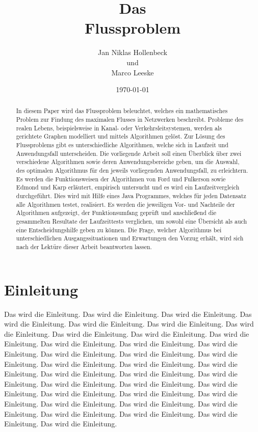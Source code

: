 \documentclass[11pt]{llncs}
\title{Das \\ Flussproblem}
\author{Jan Niklas Hollenbeck \\ und \\ Marco Leeske}
\date{\today}
\begin{document}
\maketitle

\newpage

\begin{abstract}

In diesem Paper wird das Flussproblem beleuchtet, welches ein mathematisches Problem zur Findung des maximalen Flusses in Netz\-werken beschreibt.
 Probleme des realen Lebens, beispielsweise in Kanal- oder Verkehrsleitsystemen, werden als gerichtete Graphen mo\-delliert und mittels Algorithmen gelöst.
 Zur Lösung des Flussproblems gibt es unterschiedliche Algorithmen, welche sich in Laufzeit und Anwendungsfall unterscheiden.
 Die vorliegende Arbeit soll einen Überblick über zwei verschiedene Algorithmen sowie deren Anwendungsbereiche geben, um die Auswahl, des optimalen Algorithmus für den jeweils vorliegenden Anwendungsfall, zu erleichtern.
 Es werden die Funktionsweisen der Algorithmen von Ford und Fulkerson sowie Edmond und Karp erläutert, empirisch untersucht und es wird ein Laufzeitvergleich durchgeführt.
 Dies wird mit Hilfe eines Java Programmes, welches für jeden Datensatz alle Algorithmen testet, realisiert.
Es werden die jeweiligen Vor- und Nachteile der Algorithmen aufgezeigt, der Funktionsumfang geprüft und anschließend die gesammelten Resultate der Laufzeittests verglichen, um sowohl eine Übersicht als auch eine Entscheidungshilfe geben zu können.
 Die Frage, welcher Algorithmus bei unterschiedlichen Ausgangssituationen und Erwartungen den Vorzug erhält, wird sich nach der Lektüre dieser Arbeit beantworten lassen. 

\end{abstract}


\section{Einleitung}
\label{Einleitung}

Das wird die Einleitung. Das wird die Einleitung. Das wird die Einleitung. Das wird die Einleitung. Das wird die Einleitung. Das wird die Einleitung. Das wird die Einleitung. Das wird die Einleitung. Das wird die Einleitung. Das wird die Einleitung. Das wird die Einleitung. Das wird die Einleitung. Das wird die Einleitung. Das wird die Einleitung. Das wird die Einleitung. Das wird die Einleitung. Das wird die Einleitung. Das wird die Einleitung. Das wird die Einleitung. Das wird die Einleitung. Das wird die Einleitung. Das wird die Einleitung. Das wird die Einleitung. Das wird die Einleitung. Das wird die Einleitung. Das wird die Einleitung. Das wird die Einleitung. Das wird die Einleitung. Das wird die Einleitung. Das wird die Einleitung. Das wird die Einleitung. Das wird die Einleitung. Das wird die Einleitung. Das wird die Einleitung. Das wird die Einleitung. 
\end{document}
